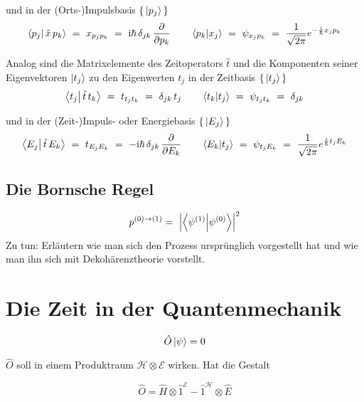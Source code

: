 \documentclass[12pt]{article}
\begin{document}
und in der (Orts-)Impulsbasis $\{\,\ket{p_j}\,\}$
\begin{equation}
\bra{p_j}\ket{\,\hat{x}\,p_k}\ =\ x_{p_j p_k}\ =\ 
\mathrm{i}\hbar\,\delta_{jk}\,\frac{\partial}{\partial p_k}
\quad\quad 
\bra{p_k}\ket{x_j}\ =\ \psi_{x_j p_k}\ =\ 
\frac{1}{\sqrt{2\pi}} e^{-\frac{i}{\hbar}x_j p_k}
\end{equation}

Analog sind die Matrixelemente des Zeitoperators $\hat{t}$ und die Komponenten seiner Eigenvektoren $\ket{t_j}$ zu den Eigenwerten $t_j$ in der Zeitbasis $\{\,\ket{t_j}\,\}$
\begin{equation}
\bra{t_j}\ket{\,\hat{t}\,t_k}\ =\ t_{t_j t_k}\ =\ \delta_{jk}\,t_j
\quad\quad 
\bra{t_k}\ket{t_j}\ =\ \psi_{t_j t_k}\ =\ \delta_{jk}
\end{equation}

und in der (Zeit-)Impuls- oder Energiebasis $\{\,\ket{E_j}\,\}$
\begin{equation}
\bra{E_j}\ket{\,\hat{t}\,E_k}\ =\ t_{E_j E_k}\ =\ 
-\mathrm{i}\hbar\,\delta_{jk}\,\frac{\partial}{\partial E_k}
\quad\quad 
\bra{E_k}\ket{t_j}\ =\ \psi_{t_j E_k}\ =\ 
\frac{1}{\sqrt{2\pi}} e^{\frac{i}{\hbar}t_j E_k}
\end{equation}

\subsection{Die Bornsche Regel}

\begin{equation} 
p^{(0)\rightarrow(1)} =\ \Bigl| \bra{\psi^{(1)}}\ket{\psi^{(0)}} \Bigr| ^2
\end{equation}
Zu tun: Erläutern wie man sich den Prozess ursprünglich vorgestellt hat und wie man ihn sich mit Dekohärenztheorie vorstellt.


\section{Die Zeit in der Quantenmechanik}

\begin{equation} 
\hat{O}\ket{\psi} = 0 
\end{equation}

$\hat{O}$ soll in einem Produktraum $\mathscr{H} \otimes \mathscr{E}$ wirken. Hat die Gestalt 

\begin{equation} 
\hat{O} = \hat{H} \otimes \hat{1}^{\mathscr{E}} - \hat{1}^{\mathscr{H}} \otimes \hat{E}
\end{equation}
\end{document}
